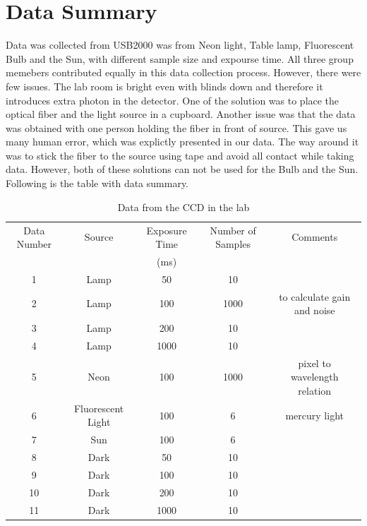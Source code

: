 \documentclass[a4paper,12pt]{article}
\begin{document}
\section{Data Summary}
\label{sec:data}
Data was collected from USB2000 was from Neon light, Table lamp, Fluorescent Bulb and the Sun, with different sample size and expourse time. All three group memebers contributed equally in this data collection process. However, there were few issues. The lab room is bright even with blinds down and therefore it introduces extra photon in the detector. One of the solution was to place the optical fiber and the light source in a cupboard. Another issue was that the data was obtained with one person holding the fiber in front of source. This gave us many human error, which was explictly presented in our data. The way around it was to stick the fiber to the source using tape and avoid all contact while taking data.  However, both of these solutions can not be used for the Bulb and the Sun. Following is the table with data summary. 
\begin{table}[H]
\centering %
\caption{Data from the CCD in the lab}
\footnotesize

\begin{tabular}{ccccc}%
\hline
\hline

Data Number  & Source & Exposure Time & Number of Samples & Comments \\
& & (ms) & &\\

 
\hline
\hline

1   &   Lamp            & 50     & 10   &\\
2   &   Lamp            & 100    & 1000 & to calculate gain and noise\\
3   &   Lamp            & 200    & 10   &\\
4   &   Lamp            & 1000   & 10   &\\
5   &   Neon            & 100    & 1000 & pixel to wavelength relation\\
6   &   Fluorescent Light& 100    & 6    & mercury light\\
7   &   Sun             & 100    & 6    &\\
8   &   Dark            & 50     & 10   &\\
9   &   Dark            & 100    & 10   &\\
10  &   Dark            & 200    & 10   &\\
11  &   Dark            & 1000   & 10   &\\

\hline
\hline

\end{tabular}
\label{table:ccd} %
\end{table}
\end{document}

